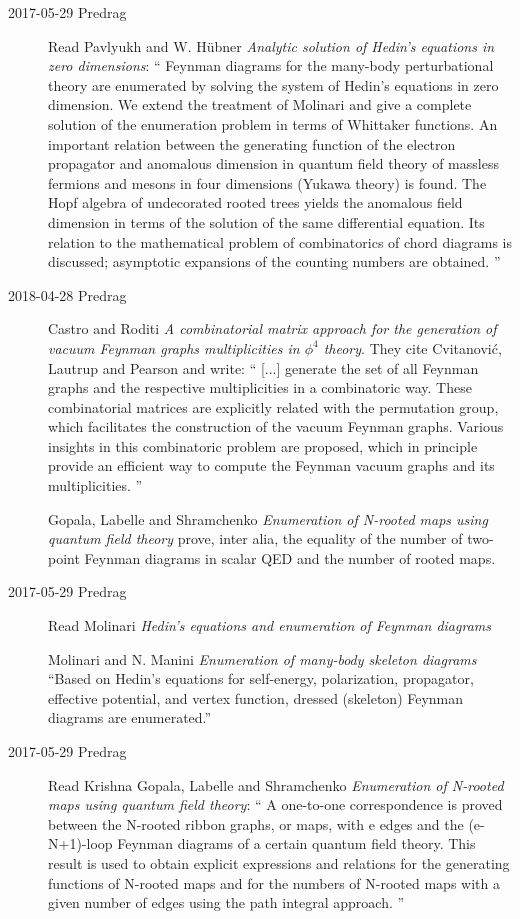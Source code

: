 \begin{description}
\item[2017-05-29 Predrag] Read
Pavlyukh and W. H{\"u}bner
{\em Analytic solution of {Hedin's} equations in zero dimensions}: ``
Feynman diagrams for the many-body perturbational theory are enumerated
by solving the system of Hedin’s equations in zero dimension. We extend
the treatment of Molinari and give a
complete solution of the enumeration problem in terms of Whittaker
functions. An important relation between the generating function of the
electron propagator and anomalous dimension in quantum field theory of
massless fermions and mesons in four dimensions (Yukawa theory) is found.
The Hopf algebra of undecorated rooted trees yields the anomalous field
dimension in terms of the solution of the same differential equation. Its
relation to the mathematical problem of combinatorics of chord diagrams
is discussed; asymptotic expansions of the counting numbers are obtained.
''

\item[2018-04-28 Predrag]
Castro and Roditi {\em A combinatorial matrix approach for the
generation of vacuum {Feynman} graphs multiplicities in {$\phi^4$} theory}.
They cite Cvitanovi\'c, Lautrup and Pearson and write: ``
[...] generate the set of all Feynman graphs and the respective multiplicities in a
combinatoric way. These combinatorial matrices are explicitly
related with the permutation group, which facilitates the construction of the
vacuum Feynman graphs. Various insights in this combinatoric problem are
proposed, which in principle provide an efficient way to compute the Feynman
vacuum graphs and its multiplicities.
''

Gopala, Labelle and Shramchenko
{\em Enumeration of {N}-rooted maps using quantum field theory}
prove, inter alia, the equality of the number of two-point Feynman diagrams in
scalar QED and the number of rooted maps.

\item[2017-05-29 Predrag] Read
Molinari
{\em Hedin's equations and enumeration of {Feynman} diagrams}

Molinari and N. Manini
{\em Enumeration of many-body skeleton diagrams}
``Based on Hedin's equations for self-energy, polarization, propagator,
effective potential, and vertex function, dressed (skeleton) Feynman
diagrams are enumerated.''

\item[2017-05-29 Predrag] Read
Krishna Gopala, Labelle  and Shramchenko
{\em Enumeration of {N}-rooted maps using quantum field theory}: ``
A one-to-one correspondence is proved between the N-rooted ribbon graphs,
or maps, with e edges and the (e-N+1)-loop Feynman diagrams of a certain
quantum field theory. This result is used to obtain explicit expressions
and relations for the generating functions of N-rooted maps and for the
numbers of N-rooted maps with a given number of edges using the path
integral approach.
''


\end{description}

